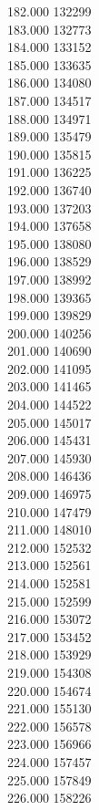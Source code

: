 { 182.000	132299 \\
 183.000	132773 \\
 184.000	133152 \\
 185.000	133635 \\
 186.000	134080 \\
 187.000	134517 \\
 188.000	134971 \\
 189.000	135479 \\
 190.000	135815 \\
 191.000	136225 \\
 192.000	136740 \\
 193.000	137203 \\
 194.000	137658 \\
 195.000	138080 \\
 196.000	138529 \\
 197.000	138992 \\
 198.000	139365 \\
 199.000	139829 \\
 200.000	140256 \\
 201.000	140690 \\
 202.000	141095 \\
 203.000	141465 \\
 204.000	144522 \\
 205.000	145017 \\
 206.000	145431 \\
 207.000	145930 \\
 208.000	146436 \\
 209.000	146975 \\
 210.000	147479 \\
 211.000	148010 \\
 212.000	152532 \\
 213.000	152561 \\
 214.000	152581 \\
 215.000	152599 \\
 216.000	153072 \\
 217.000	153452 \\
 218.000	153929 \\
 219.000	154308 \\
 220.000	154674 \\
 221.000	155130 \\
 222.000	156578 \\
 223.000	156966 \\
 224.000	157457 \\
 225.000	157849 \\
 226.000	158226 \\
}

